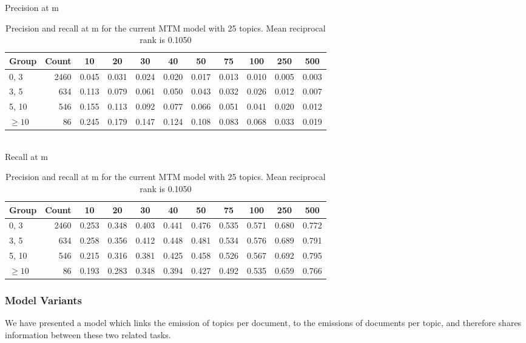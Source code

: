 \begin{table}{\small
Precision at m\\
\begin{tabular}{| l | r || c | c | c | c | c | c | c | c | c |}\hline
 Group    & Count &    10 &    20 &    30 &    40 &    50 &    75 &   100 &   250 &   500  \\
\hline
  0,    3 &      2460 & 0.045 & 0.031 & 0.024 & 0.020 & 0.017 & 0.013 & 0.010 & 0.005 & 0.003  \\
  3,    5 &       634 & 0.113 & 0.079 & 0.061 & 0.050 & 0.043 & 0.032 & 0.026 & 0.012 & 0.007  \\
  5,   10 &       546 & 0.155 & 0.113 & 0.092 & 0.077 & 0.066 & 0.051 & 0.041 & 0.020 & 0.012  \\
 $\geq 10$ &        86 & 0.245 & 0.179 & 0.147 & 0.124 & 0.108 & 0.083 & 0.068 & 0.033 & 0.019  \\
\hline\end{tabular}\\

Recall at m\\
\begin{tabular}{| l | r || c | c | c | c | c | c | c | c | c |}\hline
 Group    & Count &    10 &    20 &    30 &    40 &    50 &    75 &   100 &   250 &   500  \\ \hline
  0,    3 &      2460 & 0.253 & 0.348 & 0.403 & 0.441 & 0.476 & 0.535 & 0.571 & 0.680 & 0.772  \\
  3,    5 &       634 & 0.258 & 0.356 & 0.412 & 0.448 & 0.481 & 0.534 & 0.576 & 0.689 & 0.791  \\
  5,   10 &       546 & 0.215 & 0.316 & 0.381 & 0.425 & 0.458 & 0.526 & 0.567 & 0.692 & 0.795  \\
 $\geq 10$ &        86 & 0.193 & 0.283 & 0.348 & 0.394 & 0.427 & 0.492 & 0.535 & 0.659 & 0.766  \\
\hline\end{tabular}
\caption{Precision and recall at m for the current MTM model with 25 topics. Mean reciprocal rank is 0.1050}\label{tbl:mtm-new}
}\end{table}

\subsubsection*{Model Variants}
We have presented a model which links the emission of topics per document, to the emissions of documents per topic, and therefore shares information between these two related tasks. \\

